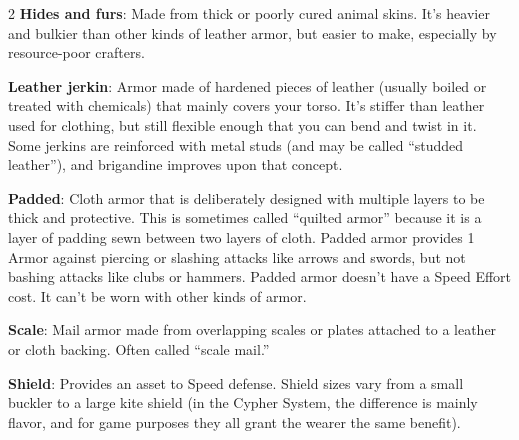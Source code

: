 \begin{multicols}{2}
\textbf{Hides and furs}: Made from thick or poorly cured animal skins. It’s heavier and bulkier than other kinds of leather armor, but easier to make, especially by resource-poor crafters. 

\textbf{Leather jerkin}: Armor made of hardened pieces of leather (usually boiled or treated with chemicals) that mainly covers your torso. It’s stiffer than leather used for clothing, but still flexible enough that you can bend and twist in it. Some jerkins are reinforced with metal studs (and may be called “studded leather”), and brigandine improves upon that concept. 

\textbf{Padded}: Cloth armor that is deliberately designed with multiple layers to be thick and protective. This is sometimes called “quilted armor” because it is a layer of padding sewn between two layers of cloth. Padded armor provides 1 Armor against piercing or slashing attacks like arrows and swords, but not bashing attacks like clubs or hammers. Padded armor doesn’t have a Speed Effort cost. It can’t be worn with other kinds of armor.

\textbf{Scale}: Mail armor made from overlapping scales or plates attached to a leather or cloth backing. Often called “scale mail.” 

\textbf{Shield}: Provides an asset to Speed defense. Shield sizes vary from a small buckler to a large kite shield (in the Cypher System, the difference is mainly flavor, and for game purposes they all grant the wearer the same benefit).

\end{multicols}

